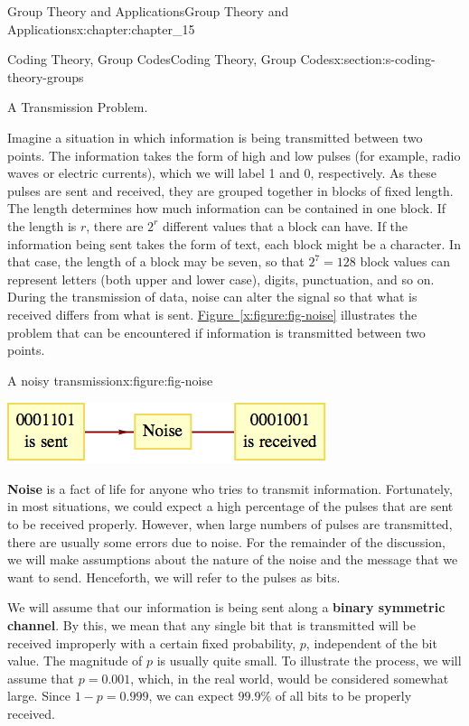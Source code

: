 \documentclass[oneside,10pt,]{book}
\newcommand{\xreffont}{\relax}
\newcommand{\terminology}[1]{\textbf{#1}}
\numberwithin{equation}{section}
\begin{document}
\begin{chapterptx}{Group Theory and Applications}{}{Group Theory and Applications}{}{}{x:chapter:chapter_15}
\begin{sectionptx}{Coding Theory, Group Codes}{}{Coding Theory, Group Codes}{}{}{x:section:s-coding-theory-groups}
\begin{introduction}{A Transmission Problem.}
\par
Imagine a situation in which information is being transmitted between two points. The information takes the form of high and low pulses (for example, radio waves or electric currents), which we will label 1 and 0, respectively.  As these pulses are sent and received, they are grouped together in blocks of fixed length.   The length determines how much information can be contained in one block.  If the length is \(r\), there are \(2^r\) different values that a block can have. If the information being sent takes the form of text, each block might be a character. In that case, the length of a block may be seven, so that \(2^7 = 128\) block values can represent letters (both upper and lower case), digits, punctuation, and so on.  During the transmission of data, noise can alter the signal so that what is received differs from what is sent. \hyperref[x:figure:fig-noise]{Figure~{\xreffont\ref{x:figure:fig-noise}}} illustrates the problem that can be encountered if information is transmitted between two points.%
\begin{figureptx}{A noisy transmission}{x:figure:fig-noise}{}%
\begin{image}{0.2}{0.6}{0.2}%
\includegraphics[width=\linewidth]{images/fig-noise.png}
\end{image}%
\tcblower
\end{figureptx}%
\terminology{Noise} is a fact of life for anyone who tries to transmit information.  Fortunately, in most situations, we could expect a high percentage of the pulses that are sent to be received properly. However, when large numbers of pulses are transmitted, there are usually some errors due to noise. For the remainder of the discussion, we will make assumptions about the nature of the noise and the message that we want to send. Henceforth, we will refer to the pulses as bits.%
\par
We will assume that our information is being sent along a \terminology{binary symmetric channel}. By this, we mean that any single bit that is transmitted will be received improperly with a certain fixed probability, \(p\), independent of the bit value.   The magnitude of \(p\) is usually quite small. To illustrate the process, we will assume that \(p = 0.001\), which, in the real world, would be considered somewhat large. Since \(1 - p = 0.999\), we can expect \(99.9\%\) of all bits to be properly received.%

\end{introduction}
\end{sectionptx}
\end{chapterptx}
\end{document}
